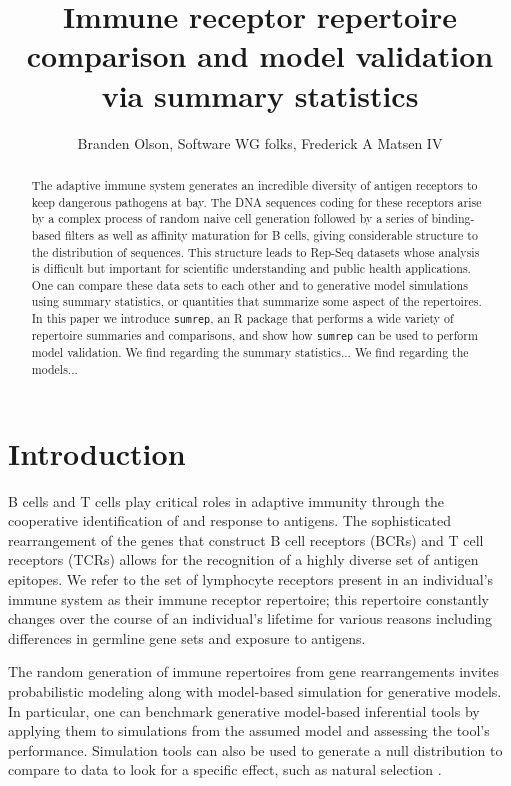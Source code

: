 \documentclass{article}
\title{Immune receptor repertoire comparison and model validation via summary statistics}
\author{Branden Olson, Software WG folks, Frederick A Matsen IV}
\begin{document}
\maketitle

\begin{abstract}
The adaptive immune system generates an incredible diversity of antigen receptors to keep dangerous pathogens at bay.
    The DNA sequences coding for these receptors arise by a complex process of random naive cell generation followed by a series of binding-based filters as well as affinity maturation for B cells, giving considerable structure to the distribution of sequences.
This structure leads to Rep-Seq datasets whose analysis is difficult but important for scientific understanding and public health applications.
One can compare these data sets to each other and to generative model simulations using summary statistics, or quantities that summarize some aspect of the repertoires.
In this paper we introduce \texttt{sumrep}, an R package that performs a wide variety of repertoire summaries and comparisons, and show how \texttt{sumrep} can be used to perform model validation.
We find regarding the summary statistics...
We find regarding the models...
\end{abstract}

\section*{Introduction}

B cells and T cells play critical roles in adaptive immunity through the cooperative identification of and response to antigens.
The sophisticated rearrangement of the genes that construct B cell receptors (BCRs) and T cell receptors (TCRs) allows for the recognition of a highly diverse set of antigen epitopes.
We refer to the set of lymphocyte receptors present in an individual's immune system as their immune receptor repertoire; this repertoire constantly changes over the course of an individual's lifetime for various reasons including differences in germline gene sets and exposure to antigens.

The random generation of immune repertoires from gene rearrangements invites probabilistic modeling along with model-based simulation for generative models.
In particular, one can benchmark generative model-based inferential tools by applying them to simulations from the assumed model and assessing the tool's performance.
Simulation tools can also be used to generate a null distribution to compare to data to look for a specific effect, such as natural selection \cite{Yaari2012-kk}.
\end{document}
